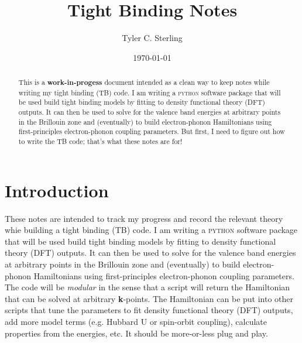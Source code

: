 \documentclass[prb,aps,11pt,superscriptaddress,floatfix]{revtex4-2}
\begin{document}
\title{Tight Binding Notes}

\author{Tyler C. Sterling}

\date{\today}

\begin{abstract}
This is a \textbf{work-in-progess} document intended as a clean way to keep notes while writing my tight binding (TB) code. I am writing a \textsc{python} software package that will be used build tight binding models by fitting to density functional theory (DFT) outputs. It can then be used to solve for the valence band energies at arbitrary points in the Brillouin zone and (eventually) to build electron-phonon Hamiltonians using first-principles electron-phonon coupling parameters. But first, I need to figure out how to write the TB code; that's what these notes are for!
\end{abstract}

\maketitle

\tableofcontents


\section{Introduction}

These notes are intended to track my progress and record the relevant theory whie building a tight binding (TB) code. I am writing a \textsc{python} software package that will be used build tight binding models by fitting to density functional theory (DFT) outputs. It can then be used to solve for the valence band energies at arbitrary points in the Brillouin zone and (eventually) to build electron-phonon Hamiltonians using first-principles electron-phonon coupling parameters. The code will be \emph{modular} in the sense that a script will return the Hamiltonian that can be solved at arbitrary \textbf{k}-points. The Hamiltonian can be put into other scripts that tune the parameters to fit density functional theory (DFT) outputs, add more model terms (e.g. Hubbard U or spin-orbit coupling), calculate properties from the energies, etc. It should be more-or-less plug and play. 
\end{document}
